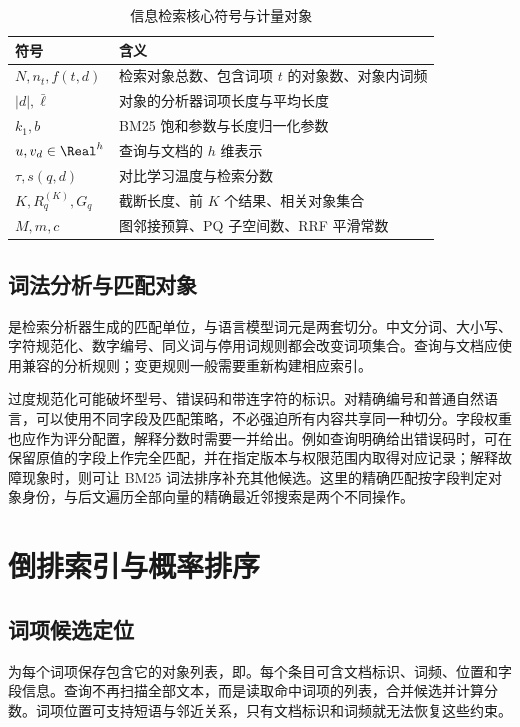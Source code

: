 \documentclass[../textbook.tex]{subfiles}
\begin{document}
\begin{table}[htbp]
\centering
\caption{信息检索核心符号与计量对象}\label{tab:information-retrieval-symbols}
\begin{tabular}{ll}
\toprule
符号 & 含义\\
\midrule
$N,n_t,f(t,d)$ & 检索对象总数、包含词项 $t$ 的对象数、对象内词频\\
$|d|,\bar\ell$ & 对象的分析器词项长度与平均长度\\
$k_1,b$ & BM25 饱和参数与长度归一化参数\\
$u,v_d\in\Real^h$ & 查询与文档的 $h$ 维表示\\
$\tau,s(q,d)$ & 对比学习温度与检索分数\\
$K,R_q^{(K)},G_q$ & 截断长度、前 $K$ 个结果、相关对象集合\\
$M,m,c$ & 图邻接预算、PQ 子空间数、RRF 平滑常数\\
\bottomrule
\end{tabular}
\end{table}

\subsection{词法分析与匹配对象}
是检索分析器生成的匹配单位，与语言模型词元是两套切分。中文分词、大小写、字符规范化、数字编号、同义词与停用词规则都会改变词项集合。查询与文档应使用兼容的分析规则；变更规则一般需要重新构建相应索引。

过度规范化可能破坏型号、错误码和带连字符的标识。对精确编号和普通自然语言，可以使用不同字段及匹配策略，不必强迫所有内容共享同一种切分。字段权重也应作为评分配置，解释分数时需要一并给出。例如查询明确给出错误码时，可在保留原值的字段上作完全匹配，并在指定版本与权限范围内取得对应记录；解释故障现象时，则可让 BM25 词法排序补充其他候选。这里的精确匹配按字段判定对象身份，与后文遍历全部向量的精确最近邻搜索是两个不同操作。

\section{倒排索引与概率排序}

\subsection{词项候选定位}
为每个词项保存包含它的对象列表，即。每个条目可含文档标识、词频、位置和字段信息。查询不再扫描全部文本，而是读取命中词项的列表，合并候选并计算分数。词项位置可支持短语与邻近关系，只有文档标识和词频就无法恢复这些约束。
\end{document}
